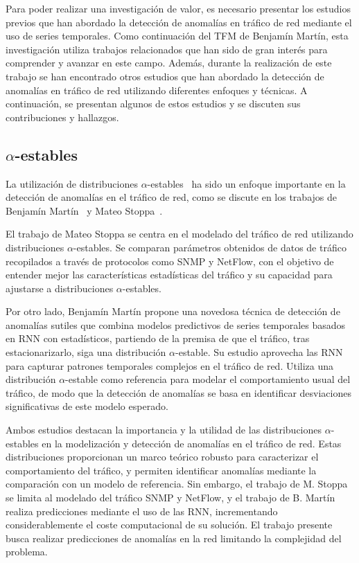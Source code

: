 Para poder realizar una investigación de valor, es necesario presentar los estudios previos que han abordado la detección de anomalías en tráfico de red mediante el uso de series temporales. Como continuación del \ac{TFM} de Benjamín Martín, esta investigación utiliza trabajos relacionados que han sido de gran interés para comprender y avanzar en este campo. Además, durante la realización de este trabajo se han encontrado otros estudios que han abordado la detección de anomalías en tráfico de red utilizando diferentes enfoques y técnicas. A continuación, se presentan algunos de estos estudios y se discuten sus contribuciones y hallazgos.

\subsection{$\alpha$-estables} %
La utilización de distribuciones $\alpha$-estables~\cite{nolan2020univariate} ha sido un enfoque importante en la detección de anomalías en el tráfico de red, como se discute en los trabajos de Benjamín Martín~\cite{benjamin2023} y Mateo Stoppa~\cite{mateo2013}.

El trabajo de Mateo Stoppa se centra en el modelado del tráfico de red utilizando distribuciones $\alpha$-estables. Se comparan parámetros obtenidos de datos de tráfico recopilados a través de protocolos como SNMP y NetFlow, con el objetivo de entender mejor las características estadísticas del tráfico y su capacidad para ajustarse a distribuciones $\alpha$-estables.

Por otro lado, Benjamín Martín propone una novedosa técnica de detección de anomalías sutiles que combina modelos predictivos de series temporales basados en \ac{RNN} con estadísticos, partiendo de la premisa de que el tráfico, tras estacionarizarlo, siga una distribución $\alpha$-estable.
Su estudio aprovecha las \ac{RNN} para capturar patrones temporales complejos en el tráfico de red. Utiliza una distribución $\alpha$-estable como referencia para modelar el comportamiento usual del tráfico, de modo que la detección de anomalías se basa en identificar desviaciones significativas de este modelo esperado.

Ambos estudios destacan la importancia y la utilidad de las distribuciones $\alpha$-estables en la modelización y detección de anomalías en el tráfico de red. Estas distribuciones proporcionan un marco teórico robusto para caracterizar el comportamiento del tráfico, y permiten identificar anomalías mediante la comparación con un modelo de referencia. Sin embargo, el trabajo de M. Stoppa se limita al modelado del tráfico SNMP y NetFlow, y el trabajo de B. Martín realiza predicciones mediante el uso de las \ac{RNN}, incrementando considerablemente el coste computacional de su solución. El trabajo presente busca realizar predicciones de anomalías en la red limitando la complejidad del problema.

